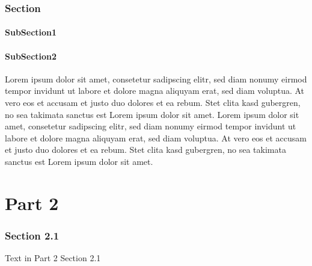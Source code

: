 \section{Section}

\subsection{SubSection1}





\subsection{SubSection2}

Lorem ipsum dolor sit amet, consetetur sadipscing elitr, sed diam nonumy eirmod tempor invidunt ut labore et dolore magna aliquyam erat, sed diam voluptua. At vero eos et accusam et justo duo dolores et ea rebum. Stet clita kasd gubergren, no sea takimata sanctus est Lorem ipsum dolor sit amet. Lorem ipsum dolor sit amet, consetetur sadipscing elitr, sed diam nonumy eirmod tempor invidunt ut labore et dolore magna aliquyam erat, sed diam voluptua. At vero eos et accusam et justo duo dolores et ea rebum. Stet clita kasd gubergren, no sea takimata sanctus est Lorem ipsum dolor sit amet.


\part{Part 2}

\section{Section 2.1}

Text in Part 2 Section 2.1
